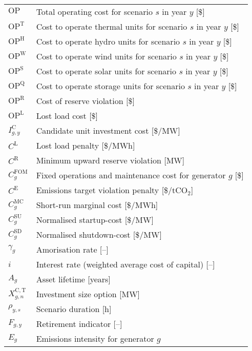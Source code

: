 \documentclass{article}
\newcommand{\iGenerator}{g}
\newcommand{\iYear}{y}
\newcommand{\iScenario}{s}
\newcommand{\iInvestmentSizeOption}{n}
\newcommand{\cOperatingCost}[1][]{\mathrm{OP}_{#1}}
\newcommand{\cOperatingCostThermal}[1][]{\mathrm{OP}^{\mathrm{T}}_{#1}}
\newcommand{\cOperatingCostHydro}[1][]{\mathrm{OP}^{\mathrm{H}}_{#1}}
\newcommand{\cOperatingCostWind}[1][]{\mathrm{OP}^{\mathrm{W}}_{#1}}
\newcommand{\cOperatingCostSolar}[1][]{\mathrm{OP}^{\mathrm{S}}_{#1}}
\newcommand{\cOperatingCostStorage}[1][]{\mathrm{OP}^{\mathrm{Q}}_{#1}}
\newcommand{\cFixedOperationsMaintenanceCostGenerator}[1][\iGenerator]{C^{\mathrm{FOM}}_{#1}}
\newcommand{\cScenarioDuration}[1][\iYear,\iScenario]{\rho_{#1}}
\newcommand{\cMarginalCost}[1][\iGenerator]{C^{\mathrm{MC}}_{#1}}
\newcommand{\cStartupCost}[1][\iGenerator]{C^{\mathrm{SU}}_{#1}}
\newcommand{\cShutdownCost}[1][\iGenerator]{C^{\mathrm{SD}}_{#1}}
\newcommand{\cEmissionsIntensity}[1][\iGenerator]{E_{#1}}
\newcommand{\cAmortisationRate}[1][\iGenerator]{\gamma_{#1}}
\newcommand{\cCandidateInvestmentCost}[1][\iGenerator,\iYear]{I^{\mathrm{C}}_{#1}}
\newcommand{\cInterestRate}{i}
\newcommand{\cAssetLifetime}[1][\iGenerator]{A_{#1}}
\newcommand{\cInvestmentSize}{X^{\mathrm{C,T}}_{\iGenerator,\iInvestmentSizeOption}}
\newcommand{\cOperatingCostLostLoad}[1][]{\mathrm{OP}^{\mathrm{L}}_{#1}}
\newcommand{\cLostLoadCost}{C^{\mathrm{L}}}
\newcommand{\cReserveUpViolationPenalty}{C^{\mathrm{R}}}
\newcommand{\cOperatingCostReserveUpViolation}[1][]{\mathrm{OP}^{\mathrm{R}}_{#1}}
\newcommand{\cEmissionsTargetViolationPenalty}{C^{\mathrm{E}}}
\newcommand{\cRetirementIndicator}[1][\iGenerator,\iYear]{F_{#1}}
\begin{document}
\begin{longtable}{ p{}  p{}}
	$\cOperatingCost$ & Total operating cost for scenario $\iScenario$ in year $\iYear$ [\$]\\
	$\cOperatingCostThermal$ & Cost to operate thermal units for scenario $\iScenario$ in year $\iYear$ [\$]\\
	$\cOperatingCostHydro$ & Cost to operate hydro units for scenario $\iScenario$ in year $\iYear$ [\$]\\
	$\cOperatingCostWind$ & Cost to operate wind units for scenario $\iScenario$ in year $\iYear$ [\$]\\
	$\cOperatingCostSolar$ & Cost to operate solar units for scenario $\iScenario$ in year $\iYear$ [\$]\\
	$\cOperatingCostStorage$ & Cost to operate storage units for scenario $\iScenario$ in year $\iYear$ [\$]\\
	$\cOperatingCostReserveUpViolation$ & Cost of reserve violation [\$]\\
	$\cOperatingCostLostLoad$ & Lost load cost [\$]\\
	$\cCandidateInvestmentCost$ & Candidate unit investment cost [\$/MW]\\
	$\cLostLoadCost$ & Lost load penalty [\$/MWh]\\
	$\cReserveUpViolationPenalty$ & Minimum upward reserve violation [MW]\\
	$\cFixedOperationsMaintenanceCostGenerator$ & Fixed operations and maintenance cost for generator $\iGenerator$ [\$]\\
	$\cEmissionsTargetViolationPenalty$ & Emissions target violation penalty [\$/tCO$_{2}$]\\
	$\cMarginalCost$ & Short-run marginal cost [\$/MWh]\\
	$\cStartupCost$ & Normalised startup-cost [\$/MW]\\
	$\cShutdownCost$ & Normalised shutdown-cost [\$/MW]\\
	$\cAmortisationRate$ & Amorisation rate [--]\\
	$\cInterestRate$ & Interest rate (weighted average cost of capital) [--]\\
	$\cAssetLifetime$ & Asset lifetime [years]\\
	$\cInvestmentSize$ & Investment size option [MW]\\
	$\cScenarioDuration$ & Scenario duration [h]\\
	$\cRetirementIndicator$ & Retirement indicator [--]\\
	$\cEmissionsIntensity$ & Emissions intensity for generator $\iGenerator$\\

\end{longtable}
\end{document}
